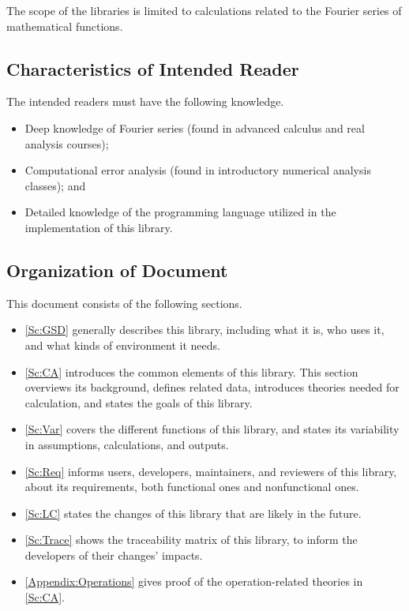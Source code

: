 \documentclass[12pt]{article}
\begin{document}
The scope of the libraries is limited to calculations related to the Fourier 
series of mathematical functions.

\subsection{Characteristics of Intended Reader} \label{sec_IntendedReader}

The intended readers must have the following knowledge.
\begin{itemize}
	\item Deep knowledge of Fourier series (found in advanced 
	calculus and real analysis courses);
	\item Computational error analysis (found in introductory numerical 
	analysis classes); and
	\item Detailed knowledge of the programming language utilized 
	in the implementation of this library.	
\end{itemize}

\subsection{Organization of Document}

This document consists of the following sections.
\begin{itemize}
	\item \autoref{Sc:GSD} generally describes this library, including 
	what it is, who uses it, and what kinds of environment it needs.
	\item \autoref{Sc:CA} introduces the common elements of this library. 
	This section overviews its background, defines related data, 
	introduces theories needed for calculation, 
	and states the goals of this library.
	\item \autoref{Sc:Var} covers the different functions of this library, 
	and states its variability in assumptions, calculations, and outputs.
	\item \autoref{Sc:Req} informs users, developers, maintainers, 
	and reviewers of this library, about its requirements, 
	both functional ones and nonfunctional ones.
	\item \autoref{Sc:LC} states the changes of this library that are 
	likely in the future.
	\item \autoref{Sc:Trace} shows the traceability matrix of this library, 
	to inform the developers of their changes' impacts.
	\item \autoref{Appendix:Operations} gives proof of the 
	operation-related theories in \autoref{Sc:CA}.
\end{itemize}
\end{document}
